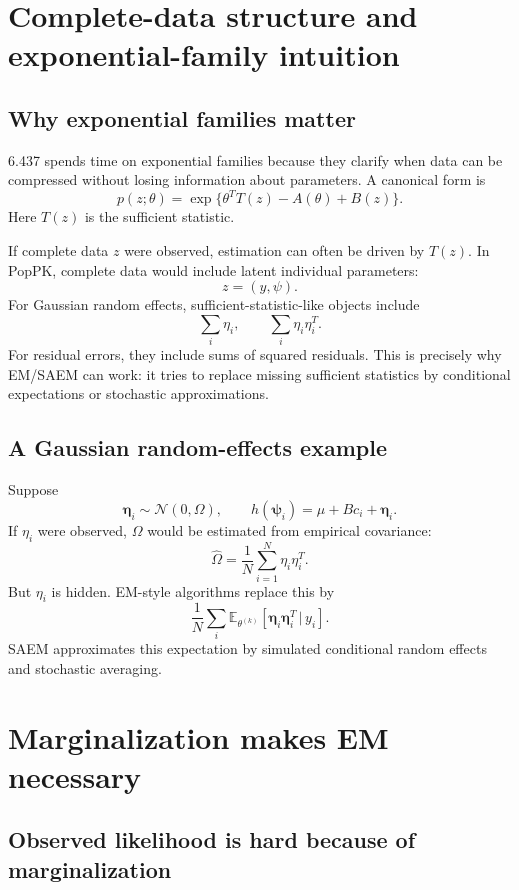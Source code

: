 \documentclass[a4paper]{article}
\newcommand{\rpsi}{\boldsymbol{\psi}}
\newcommand{\reta}{\boldsymbol{\eta}}
\newcommand{\given}{\,|\,}
\newcommand{\E}{\mathbb{E}}
\newcommand{\Normal}{\mathcal{N}}
\begin{document}
\section{Complete-data structure and exponential-family intuition}

\subsection{Why exponential families matter}

6.437 spends time on exponential families because they clarify when data can be compressed without losing information about parameters. A canonical form is
\[
  p(z;\theta)
  =
  \exp\{\theta^T T(z)-A(\theta)+B(z)\}.
\]
Here \(T(z)\) is the sufficient statistic.

If complete data \(z\) were observed, estimation can often be driven by \(T(z)\). In PopPK, complete data would include latent individual parameters:
\[
  z=(y,\psi).
\]
For Gaussian random effects, sufficient-statistic-like objects include
\[
  \sum_i \eta_i,\qquad
  \sum_i \eta_i\eta_i^T.
\]
For residual errors, they include sums of squared residuals. This is precisely why EM/SAEM can work: it tries to replace missing sufficient statistics by conditional expectations or stochastic approximations.

\subsection{A Gaussian random-effects example}

Suppose
\[
  \reta_i\sim \Normal(0,\Omega),
  \qquad
  h(\rpsi_i)=\mu+B c_i+\reta_i.
\]
If \(\eta_i\) were observed, \(\Omega\) would be estimated from empirical covariance:
\[
  \widehat\Omega
  =
  \frac{1}{N}\sum_{i=1}^N \eta_i\eta_i^T.
\]
But \(\eta_i\) is hidden. EM-style algorithms replace this by
\[
  \frac{1}{N}\sum_i
  \E_{\theta^{(k)}}[
    \reta_i\reta_i^T
    \given y_i
  ].
\]
SAEM approximates this expectation by simulated conditional random effects and stochastic averaging.

\section{Marginalization makes EM necessary}

\subsection{Observed likelihood is hard because of marginalization}
\end{document}
